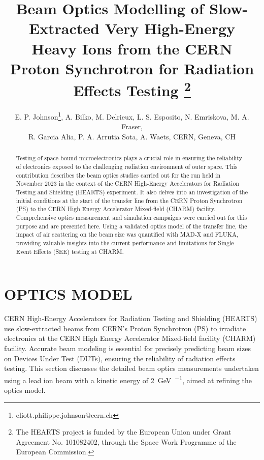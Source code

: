 \documentclass[a4paper,
               biblatex,     %
               ]{jacow}
\begin{document}
\title{Beam Optics Modelling of Slow-Extracted Very High-Energy Heavy Ions from the CERN Proton Synchrotron for Radiation Effects Testing \thanks{The HEARTS project is funded by the European Union under Grant Agreement No. 101082402, through the Space Work Programme of the European Commission.}}

\author{E. P. Johnson\thanks{eliott.philippe.johnson@cern.ch},
    A. Bilko, 
    M. Delrieux, 
    L. S. Esposito, 
    N. Emriskova, 
    M. A. Fraser,\\ 
    R. Garcia Alia,
    P. A. Arrutia Sota, 
    A. Waets, CERN, Geneva, CH}
	
\maketitle

%
\begin{abstract}
   Testing of space-bound microelectronics plays a crucial role in ensuring the reliability of electronics exposed to the challenging radiation environment of outer space. This contribution describes the beam optics studies carried out for the run held in November 2023 in the context of the CERN High-Energy Accelerators for Radiation Testing and Shielding (HEARTS) experiment. It also delves into an investigation of the initial conditions at the start of the transfer line from the CERN Proton Synchrotron (PS) to the CERN High Energy Accelerator Mixed-field (CHARM) facility. Comprehensive optics measurement and simulation campaigns were carried out for this purpose and are presented here. Using a validated optics model of the transfer line, the impact of air scattering on the beam size was quantified with MAD-X and FLUKA, providing valuable insights into the current performance and limitations for Single Event Effects (SEE) testing at CHARM.
\end{abstract}







\section{OPTICS MODEL}

CERN High-Energy Accelerators for Radiation Testing and Shielding (HEARTS) \cite{noauthor_hearts_nodate} use slow-extracted beams from CERN's Proton Synchrotron (PS) to irradiate electronics at the CERN High Energy Accelerator Mixed-field facility (CHARM) facility. Accurate beam modeling is essential for precisely predicting beam sizes on Devices Under Test (DUTs), ensuring the reliability of radiation effects testing. This section discusses the detailed beam optics measurements undertaken using a lead ion beam with a kinetic energy of \SI{2}{\giga\electronvolt\per\nucleon}, aimed at refining the optics model. 
\end{document}
